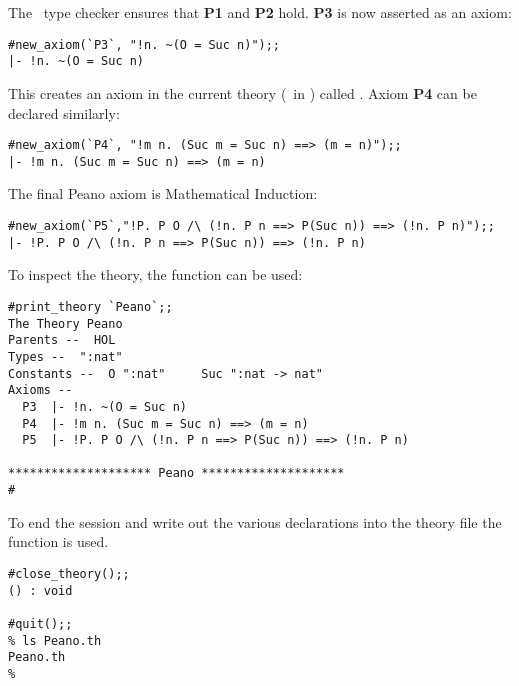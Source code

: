 {The \HOL\ type checker ensures that {\small\bf P1} and {\small\bf P2} hold.
{\small\bf P3} is now asserted as an axiom:

\begin{session}\begin{verbatim}
#new_axiom(`P3`, "!n. ~(O = Suc n)");;
|- !n. ~(O = Suc n)
\end{verbatim}\end{session}

\noindent This creates an axiom in the current theory (\ie\ in ) called
. Axiom {\small\bf P4} can be declared similarly:


\begin{session}\begin{verbatim}
#new_axiom(`P4`, "!m n. (Suc m = Suc n) ==> (m = n)");;
|- !m n. (Suc m = Suc n) ==> (m = n)
\end{verbatim}\end{session}

The final Peano axiom is Mathematical Induction:

\begin{session}\begin{verbatim}
#new_axiom(`P5`,"!P. P O /\ (!n. P n ==> P(Suc n)) ==> (!n. P n)");;
|- !P. P O /\ (!n. P n ==> P(Suc n)) ==> (!n. P n)
\end{verbatim}\end{session}

To inspect the theory, the function  can be used:

\begin{session}\begin{verbatim}
#print_theory `Peano`;;
The Theory Peano
Parents --  HOL     
Types --  ":nat"     
Constants --  O ":nat"     Suc ":nat -> nat"     
Axioms --
  P3  |- !n. ~(O = Suc n)
  P4  |- !m n. (Suc m = Suc n) ==> (m = n)
  P5  |- !P. P O /\ (!n. P n ==> P(Suc n)) ==> (!n. P n)
  
******************** Peano ********************
#\end{verbatim}\end{session}

To end the session and write out the various declarations into the theory file
 the function  is used.

\begin{session}\begin{verbatim}
#close_theory();;
() : void

#quit();;
% ls Peano.th
Peano.th
% 
\end{verbatim}\end{session}

}
